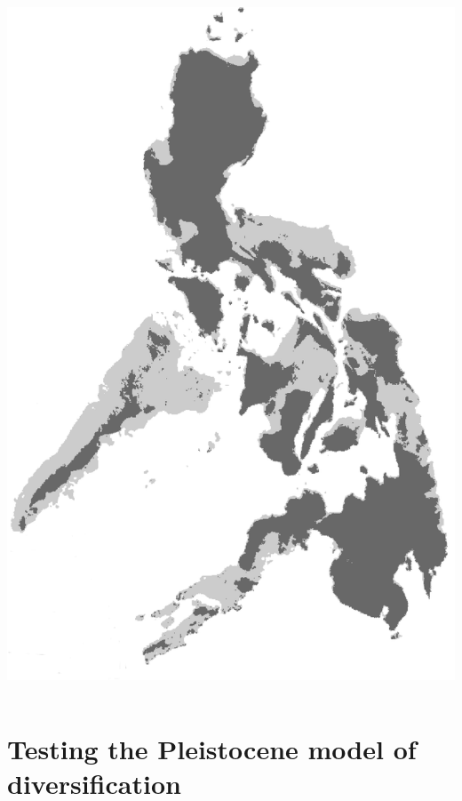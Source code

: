 \begin{frame}
\begin{columns}[c]
            \includegraphics[width=\textwidth]{images/maps/Philippines.png}
    \end{columns}
\end{frame}

\section{Testing the Pleistocene model of diversification}

